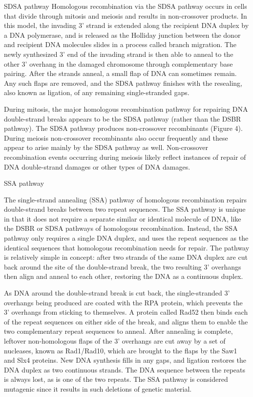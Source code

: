 SDSA pathway
Homologous recombination via the SDSA pathway occurs in cells that divide through mitosis and meiosis and results in non-crossover products. In this model, the invading 3' strand is extended along the recipient DNA duplex by a DNA polymerase, and is released as the Holliday junction between the donor and recipient DNA molecules slides in a process called branch migration. The newly synthesized 3' end of the invading strand is then able to anneal to the other 3' overhang in the damaged chromosome through complementary base pairing. After the strands anneal, a small flap of DNA can sometimes remain. Any such flaps are removed, and the SDSA pathway finishes with the resealing, also known as ligation, of any remaining single-stranded gaps.

During mitosis, the major homologous recombination pathway for repairing DNA double-strand breaks appears to be the SDSA pathway (rather than the DSBR pathway). The SDSA pathway produces non-crossover recombinants (Figure 4). During meiosis non-crossover recombinants also occur frequently and these appear to arise mainly by the SDSA pathway as well. Non-crossover recombination events occurring during meiosis likely reflect instances of repair of DNA double-strand damages or other types of DNA damages.

SSA pathway

The single-strand annealing (SSA) pathway of homologous recombination repairs double-strand breaks between two repeat sequences. The SSA pathway is unique in that it does not require a separate similar or identical molecule of DNA, like the DSBR or SDSA pathways of homologous recombination. Instead, the SSA pathway only requires a single DNA duplex, and uses the repeat sequences as the identical sequences that homologous recombination needs for repair. The pathway is relatively simple in concept: after two strands of the same DNA duplex are cut back around the site of the double-strand break, the two resulting 3' overhangs then align and anneal to each other, restoring the DNA as a continuous duplex.

As DNA around the double-strand break is cut back, the single-stranded 3' overhangs being produced are coated with the RPA protein, which prevents the 3' overhangs from sticking to themselves. A protein called Rad52 then binds each of the repeat sequences on either side of the break, and aligns them to enable the two complementary repeat sequences to anneal. After annealing is complete, leftover non-homologous flaps of the 3' overhangs are cut away by a set of nucleases, known as Rad1/Rad10, which are brought to the flaps by the Saw1 and Slx4 proteins. New DNA synthesis fills in any gaps, and ligation restores the DNA duplex as two continuous strands. The DNA sequence between the repeats is always lost, as is one of the two repeats. The SSA pathway is considered mutagenic since it results in such deletions of genetic material.

